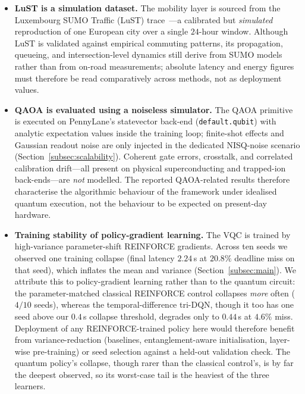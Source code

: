 \documentclass[11pt,a4paper]{article}
\theoremstyle{definition}
\begin{document}
\begin{itemize}
\item \textbf{LuST is a simulation dataset.} The mobility layer is sourced from the Luxembourg SUMO Traffic (LuST) trace~\cite{codeca2015lust}---a calibrated but \emph{simulated} reproduction of one European city over a single $24$-hour window. Although LuST is validated against empirical commuting patterns, its propagation, queueing, and intersection-level dynamics still derive from SUMO models rather than from on-road measurements; absolute latency and energy figures must therefore be read comparatively across methods, not as deployment values.

\item \textbf{QAOA is evaluated using a noiseless simulator.} The QAOA primitive is executed on PennyLane's statevector back-end (\texttt{default.qubit}) with analytic expectation values inside the training loop; finite-shot effects and Gaussian readout noise are only injected in the dedicated NISQ-noise scenario (Section~\ref{subsec:scalability}). Coherent gate errors, crosstalk, and correlated calibration drift---all present on physical superconducting and trapped-ion back-ends---are \emph{not} modelled. The reported QAOA-related results therefore characterise the algorithmic behaviour of the framework under idealised quantum execution, not the behaviour to be expected on present-day hardware.

\item \textbf{Training stability of policy-gradient learning.} The VQC is trained by high-variance parameter-shift REINFORCE gradients. Across ten seeds we observed one training collapse (final latency $2.24$\,s at $20.8\%$ deadline miss on that seed), which inflates the mean and variance (Section~\ref{subsec:main}). We attribute this to policy-gradient learning rather than to the quantum circuit: the parameter-matched classical REINFORCE control collapses \emph{more} often ($4/10$ seeds), whereas the temporal-difference tri-DQN, though it too has one seed above our $0.4$\,s collapse threshold, degrades only to $0.44$\,s at $4.6\%$ miss. Deployment of any REINFORCE-trained policy here would therefore benefit from variance-reduction (baselines, entanglement-aware initialisation, layer-wise pre-training) or seed selection against a held-out validation check. The quantum policy's collapse, though rarer than the classical control's, is by far the deepest observed, so its worst-case tail is the heaviest of the three learners.


\end{itemize}
\end{document}
